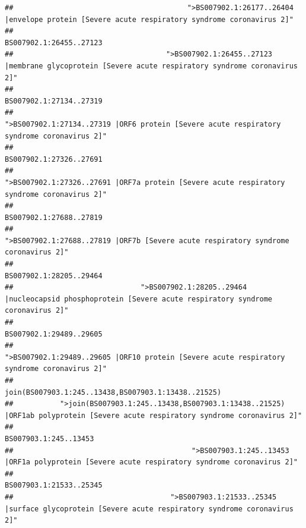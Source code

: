 \documentclass[
]{article}
\begin{document}
\begin{verbatim}
##                                         ">BS007902.1:26177..26404 |envelope protein [Severe acute respiratory syndrome coronavirus 2]" 
##                                                                                                                BS007902.1:26455..27123 
##                                    ">BS007902.1:26455..27123 |membrane glycoprotein [Severe acute respiratory syndrome coronavirus 2]" 
##                                                                                                                BS007902.1:27134..27319 
##                                             ">BS007902.1:27134..27319 |ORF6 protein [Severe acute respiratory syndrome coronavirus 2]" 
##                                                                                                                BS007902.1:27326..27691 
##                                            ">BS007902.1:27326..27691 |ORF7a protein [Severe acute respiratory syndrome coronavirus 2]" 
##                                                                                                                BS007902.1:27688..27819 
##                                                    ">BS007902.1:27688..27819 |ORF7b [Severe acute respiratory syndrome coronavirus 2]" 
##                                                                                                                BS007902.1:28205..29464 
##                              ">BS007902.1:28205..29464 |nucleocapsid phosphoprotein [Severe acute respiratory syndrome coronavirus 2]" 
##                                                                                                                BS007902.1:29489..29605 
##                                            ">BS007902.1:29489..29605 |ORF10 protein [Severe acute respiratory syndrome coronavirus 2]" 
##                                                                                    join(BS007903.1:245..13438,BS007903.1:13438..21525) 
##           ">join(BS007903.1:245..13438,BS007903.1:13438..21525) |ORF1ab polyprotein [Severe acute respiratory syndrome coronavirus 2]" 
##                                                                                                                  BS007903.1:245..13453 
##                                          ">BS007903.1:245..13453 |ORF1a polyprotein [Severe acute respiratory syndrome coronavirus 2]" 
##                                                                                                                BS007903.1:21533..25345 
##                                     ">BS007903.1:21533..25345 |surface glycoprotein [Severe acute respiratory syndrome coronavirus 2]" 

\end{verbatim}
\end{document}
